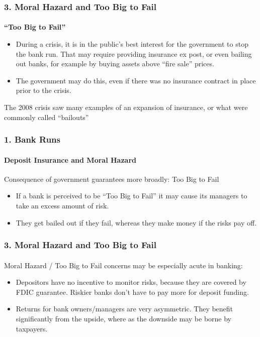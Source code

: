\documentclass{beamer}
\begin{document}
\begin{frame}[t]
\frametitle{3. Moral Hazard and Too Big to Fail}
\framesubtitle{}

    \textbf{“Too Big to Fail”}
    \vspace{1em}
    
    \begin{itemize}
        \item During a crisis, it is in the public’s best interest for the government to stop the bank run.   That may require providing insurance ex post, or even bailing out banks, for example by buying assets above “fire sale” prices.
        \item The government may do this, even if there was no insurance contract in place prior to the crisis.
    \end{itemize}
    \vspace{1em}
    
    The 2008 crisis saw many examples of an expansion of insurance, or what were commonly called  “bailouts”

\end{frame}

\begin{frame}[t]
\frametitle{1. Bank Runs}
\framesubtitle{Deposit Insurance and Moral Hazard}

    Consequence of government guarantees more broadly: Too Big to Fail
    
    \begin{itemize}
        \item If a bank is perceived to be “Too Big to Fail” it may cause its managers to take an excess amount of risk.
        \item They get bailed out if they fail, whereas they make money if the risks pay off.
    \end{itemize}

\end{frame}

\begin{frame}[t]
\frametitle{3. Moral Hazard and Too Big to Fail}
\framesubtitle{}

    Moral Hazard / Too Big to Fail concerns may be especially acute in banking:
    
    \begin{itemize}
        \item Depositors have no incentive to monitor risks, because they are covered by FDIC guarantee. Riskier banks don’t have to pay more for deposit funding.
        \item Returns for bank owners/managers are very asymmetric.  They benefit significantly from the upside, where as the downside may be borne by taxpayers.
    \end{itemize}

\end{frame}
\end{document}
